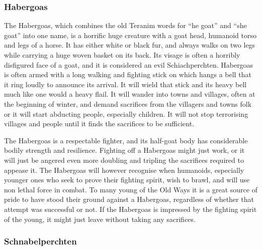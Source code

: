 \subsubsection{Habergoas}
\label{sec:Habergoas}


The Habergoas, which combines the old Teranim words for ``he goat'' and ``she
goat'' into one name, is a horrific huge creature with a goat head, humanoid
torso and legs of a horse. It has either white or black fur, and always walks
on two legs while carrying a huge woven basket on its back. Its visage is
often a horribly disfigured face of a goat, and it is considered an evil
Schiachperchten. Habergoas is often armed with a long walking and fighting
stick on which hangs a bell that it ring loudly to announce its arrival. It
will wield that stick and its heavy bell much like one would a heavy flail. It
will wander into towns and villages, often at the beginning of winter, and
demand sacrifices from the villagers and towns folk or it will start abducting
people, especially children. It will not stop terrorising villages and people
until it finds the sacrifices to be sufficient.

The Habergoas is a respectable fighter, and its half-goat body has
considerable bodily strength and resilience. Fighting off a Habergoas might
just work, or it will just be angered even more doubling and tripling the
sacrifices required to appease it. The Habergoas will however recognise when
humanoids, especially younger ones who seek to prove their fighting spirit,
wish to brawl, and will use non lethal force in combat. To many young of the
Old Ways it is a great source of pride to have stood their ground against a
Habergoas, regardless of whether that attempt was successful or not. If the
Habergoas is impressed by the fighting spirit of the young, it might just
leave without taking any sacrifices.

\subsubsection{Schnabelperchten}
\label{sec:Schnabelperchten}

